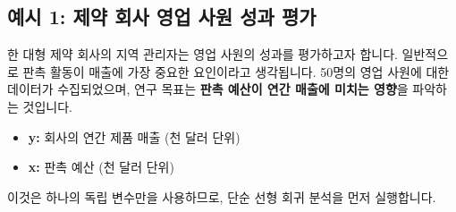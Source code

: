 \documentclass[11pt,a4paper]{article}
\begin{document}
\newpage
\subsection*{예시 1: 제약 회사 영업 사원 성과 평가}

\begin{examplebox}[title=\textbf{문제 상황}]
한 대형 제약 회사의 지역 관리자는 영업 사원의 성과를 평가하고자 합니다. 일반적으로 판촉 활동이 매출에 가장 중요한 요인이라고 생각됩니다. 50명의 영업 사원에 대한 데이터가 수집되었으며, 연구 목표는 \textbf{판촉 예산이 연간 매출에 미치는 영향}을 파악하는 것입니다.

\begin{itemize}
    \item \textbf{y:} 회사의 연간 제품 매출 (천 달러 단위)
    \item \textbf{x:} 판촉 예산 (천 달러 단위)
\end{itemize}
이것은 하나의 독립 변수만을 사용하므로, 단순 선형 회귀 분석을 먼저 실행합니다.
\end{examplebox}
\end{document}
